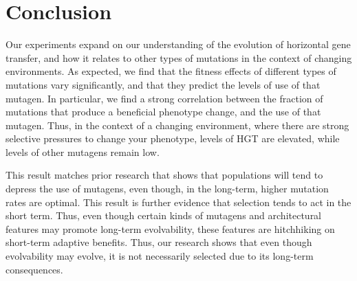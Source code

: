 \documentclass[PhD]{msu-thesis}
\begin{document}


\section{Conclusion}
Our experiments expand on our understanding of the evolution of horizontal gene transfer, and how it relates to other types of mutations in the context of changing environments. As expected, we find that the fitness effects of different types of mutations vary significantly, and that they predict the levels of use of that mutagen. In particular, we find a strong correlation between the fraction of mutations that produce a beneficial phenotype change, and the use of that mutagen. Thus, in the context of a changing environment, where there are strong selective pressures to change your phenotype, levels of HGT are elevated, while levels of other mutagens remain low.

This result matches prior research that shows that populations will tend to depress the use of mutagens, even though, in the long-term, higher mutation rates are optimal\cite{clune_natural_2008}. This result is further evidence that selection tends to act in the short term. Thus, even though certain kinds of mutagens and architectural features may promote long-term evolvability, these features are hitchhiking on short-term adaptive benefits. Thus, our research shows that even though evolvability may evolve, it is not necessarily selected due to its long-term consequences. 

\end{document}
